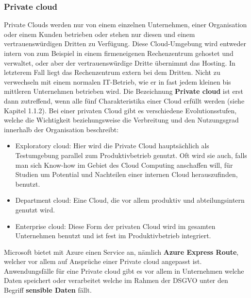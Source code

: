 \subsubsection{Private cloud}
Private Clouds werden nur von einem einzelnen Unternehmen, einer Organisation oder einem Kunden betrieben oder stehen nur diesen und einem vertrauenswürdigen Dritten zu Verfügung. Diese Cloud-Umgebung wird entweder intern von zum Beispiel in einem firmeneigenen Rechenzentrum gehostet und verwaltet, oder aber der vertrauenswürdige Dritte übernimmt das Hosting. In letzterem Fall liegt das Rechenzentrum extern bei dem Dritten. Nicht zu verwechseln mit einem normalen IT-Betrieb, wie er in fast jedem kleinen bis mittleren Unternehmen betrieben wird. Die Bezeichnung \textbf{Private cloud} ist erst dann zutreffend, wenn alle fünf Charakteristika einer Cloud erfüllt werden (siehe Kapitel 1.1.2).
Bei einer privaten Cloud gibt es verschiedene Evolutionsstufen, welche die Wichtigkeit beziehungsweise die Verbreitung und den Nutzungsgrad innerhalb der Organisation beschreibt:
\begin{itemize}
	\item Exploratory cloud: Hier wird die Private Cloud hauptsächlich als Testumgebung parallel zum Produktivbetrieb genutzt. Oft wird sie auch, falls man sich Know-how im Gebiet des Cloud Computing anschaffen will, für Studien um Potential und Nachteilen einer internen Cloud herauszufinden, benutzt.
	\item Department cloud: Eine Cloud, die vor allem produktiv und abteilungsintern genutzt wird.
	\item Enterprise cloud: Diese Form der privaten Cloud wird im gesamten Unternehmen benutzt und ist fest im Produktivbetrieb integriert.
\end{itemize}

Microsoft bietet mit Azure einen Service an, nämlich \textbf{Azure Express Route}, welcher vor allem auf Ansprüche einer Private cloud angepasst ist.
Anwendungsfälle für eine Private cloud gibt es vor allem in Unternehmen welche Daten speichert oder verarbeitet welche im Rahmen der DSGVO unter den Begriff \textbf{sensible Daten} fällt.

